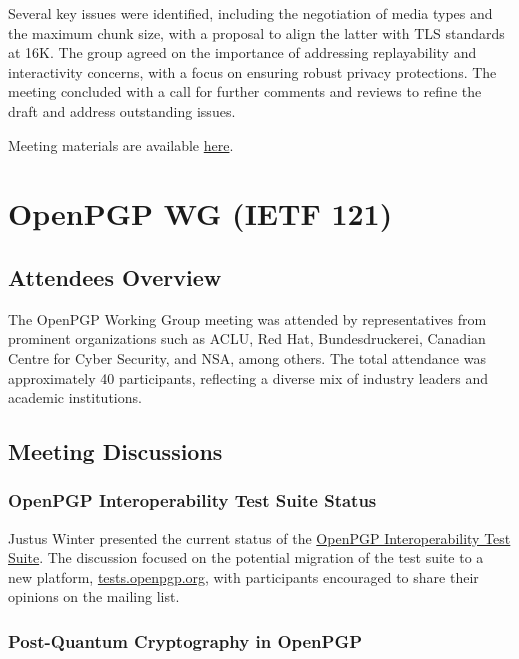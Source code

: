 \documentclass{article}
\begin{document}
Several key issues were identified, including the negotiation of media types and the maximum chunk size, with a proposal to align the latter with TLS standards at 16K. The group agreed on the importance of addressing replayability and interactivity concerns, with a focus on ensuring robust privacy protections. The meeting concluded with a call for further comments and reviews to refine the draft and address outstanding issues.

Meeting materials are available \href{https://datatracker.ietf.org/meeting/121/materials/slides-121-ohai-chair-slides-00}{here}.




\newpage

\section{OpenPGP WG (IETF 121)}

\subsection{Attendees Overview}

The OpenPGP Working Group meeting was attended by representatives from prominent organizations such as ACLU, Red Hat, Bundesdruckerei, Canadian Centre for Cyber Security, and NSA, among others. The total attendance was approximately 40 participants, reflecting a diverse mix of industry leaders and academic institutions.

\subsection{Meeting Discussions}

\subsubsection{OpenPGP Interoperability Test Suite Status}

Justus Winter presented the current status of the \href{https://tests.sequoia-pgp.org/}{OpenPGP Interoperability Test Suite}. The discussion focused on the potential migration of the test suite to a new platform, \href{https://tests.openpgp.org}{tests.openpgp.org}, with participants encouraged to share their opinions on the mailing list.

\subsubsection{Post-Quantum Cryptography in OpenPGP}
\end{document}
